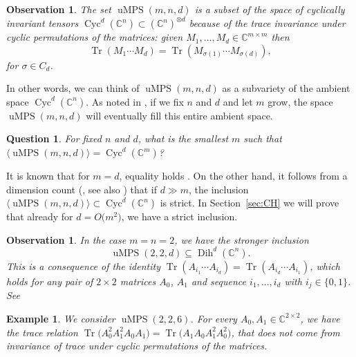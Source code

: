 \documentclass[10pt,a4paper]{amsart}
\numberwithin{equation}{section}
\newtheorem{Question}[Theorem]{Question}
\newtheorem{Example}[Theorem]{Example}
\newtheorem{observation}[Theorem]{Observation}
\DeclareMathOperator{\Tr}{Tr}
\newcommand{\CC}{\mathbb{C}}
\DeclareMathOperator{\uMPS}{uMPS}
\DeclareMathOperator{\Cyc}{Cyc}
\DeclareMathOperator{\Dih}{Dih}
\begin{document}
\begin{observation}
The set $\uMPS(m,n,d)$ is a subset of the space of cyclically invariant tensors $\Cyc^d({\mathbb C}^n)\subset ({\mathbb C}^n)^{\otimes d}$ because of the trace invariance under cyclic permutations of the matrices: given $M_1,\dots,M_{d}\in {\mathbb C}^{m \times m}$ then
\[
\Tr(M_1\cdots M_{d})= \Tr(M_{\sigma(1)}\cdots M_{\sigma(d)}),
\]
for $\sigma \in C_d$.
\end{observation}
In other words, we can think of $\uMPS(m,n,d)$ as a subvariety of the ambient space $\Cyc^d({\mathbb C}^n)$. As noted in \cite[Corollary 3.18]{Czaplinski2019UniformMP}, if we fix $n$ and $d$ and let $m$ grow, the space $\uMPS(m,n,d)$ will eventually fill this entire ambient space.
\begin{Question} \label{question:fills}
For fixed $n$ and $d$, what is the smallest $m$ such that $\langle \uMPS(m,n,d) \rangle \!=\! \Cyc^d(\CC^m)$? \end{Question}
It is known that for $m=d$, equality holds \cite[Proposition 3.11]{Czaplinski2019UniformMP}. On the other hand, it follows from a dimension count (\cite[Theorem 3.14]{Czaplinski2019UniformMP}, see also \cite{navascues2018bond}) that if $d \gg m$, the inclusion $\langle \uMPS(m,n,d) \rangle \subset \Cyc^d(\CC^n)$ is strict. In Section~\ref{sec:CH} we will prove that already for  $d=O\big(m^2\big)$, we have a strict inclusion.
\begin{observation}\label{rmk:reflection}
    In the case $m=n=2$, we have the stronger inclusion
\[
    \uMPS(2,2,d) \subseteq \Dih^d(\CC^n).
\]
    This is a consequence of the identity $\Tr(A_{i_1}\cdots A_{i_{d}})= \Tr(A_{i_{d}}\cdots A_{i_1})$, which holds for any pair of $2\times 2$ matrices $A_0$, $A_1$ and sequence $i_1,\dots,i_{d}$ with $i_j \in \{0,1\}$. See \cite[Theorem 1.1]{greene2014traces}
    \end{observation}
\begin{Example}
    We consider $\uMPS(2,2,6)$.
    For every $A_0,A_1\in {\mathbb C}^{2\times 2}$, we have the trace relation
    $\Tr\big(A_0^2A_1^2A_0A_1\big)=\Tr\big(A_1A_0A_1^2A_0^2\big)$, that does not come from invariance of trace under cyclic permutations of the matrices.
\end{Example}
\end{document}
